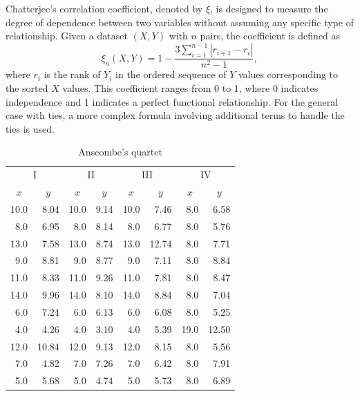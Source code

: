Chatterjee's correlation coefficient, denoted by $\xi$, is designed to measure the degree of dependence between two variables without assuming any specific type of relationship. Given a dataset $(X, Y)$ with $n$ pairs, the coefficient is defined as
\begin{equation}
\xi_n(X,Y) = 1 - \frac{3 \sum_{i=1}^{n-1} |r_{i+1} - r_i|}{n^2 - 1},
\end{equation}
where $r_i$ is the rank of $Y_i$ in the ordered sequence of $Y$ values corresponding to the sorted $X$ values. This coefficient ranges from 0 to 1, where 0 indicates independence and 1 indicates a perfect functional relationship. For the general case with ties, a more complex formula involving additional terms to handle the ties is used.


\begin{table}[ht]
\centering
\caption{Anscombe's quartet}
\label{tab:valores}
\begin{tabular}{rr|rr|rr|rr}
\toprule
\multicolumn{2}{c|}{I} & \multicolumn{2}{c|}{II} & \multicolumn{2}{c|}{III} & \multicolumn{2}{c}{IV} \\

\multicolumn{1}{c}{$x$} & \multicolumn{1}{c|}{$y$} & \multicolumn{1}{c}{$x$} & \multicolumn{1}{c|}{$y$} & \multicolumn{1}{c}{$x$} & \multicolumn{1}{c|}{$y$} & \multicolumn{1}{c}{$x$} & \multicolumn{1}{c}{$y$} \\
\midrule
10.0 & 8.04 & 10.0 & 9.14 & 10.0 & 7.46 & 8.0 & 6.58 \\
8.0 & 6.95 & 8.0 & 8.14 & 8.0 & 6.77 & 8.0 & 5.76 \\
13.0 & 7.58 & 13.0 & 8.74 & 13.0 & 12.74 & 8.0 & 7.71 \\
9.0 & 8.81 & 9.0 & 8.77 & 9.0 & 7.11 & 8.0 & 8.84 \\
11.0 & 8.33 & 11.0 & 9.26 & 11.0 & 7.81 & 8.0 & 8.47 \\
14.0 & 9.96 & 14.0 & 8.10 & 14.0 & 8.84 & 8.0 & 7.04 \\
6.0 & 7.24 & 6.0 & 6.13 & 6.0 & 6.08 & 8.0 & 5.25 \\
4.0 & 4.26 & 4.0 & 3.10 & 4.0 & 5.39 & 19.0 & 12.50 \\
12.0 & 10.84 & 12.0 & 9.13 & 12.0 & 8.15 & 8.0 & 5.56 \\
7.0 & 4.82 & 7.0 & 7.26 & 7.0 & 6.42 & 8.0 & 7.91 \\
5.0 & 5.68 & 5.0 & 4.74 & 5.0 & 5.73 & 8.0 & 6.89 \\
\bottomrule
\end{tabular}
\end{table}

